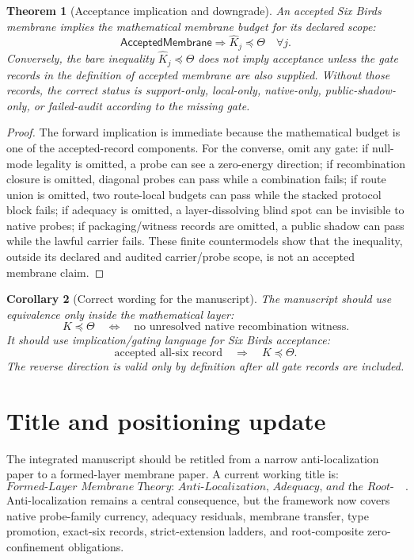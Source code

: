 \documentclass[11pt]{article}
\newtheorem{theorem}{Theorem}[section]
\newtheorem{corollary}[theorem]{Corollary}
\begin{document}
\begin{theorem}[Acceptance implication and downgrade]
An accepted Six Birds membrane implies the mathematical membrane budget for its declared scope:
\[
  \mathsf{AcceptedMembrane}\Longrightarrow \widehat K_j\preceq\Theta\quad\forall j.
\]
Conversely, the bare inequality \(\widehat K_j\preceq\Theta\) does not imply acceptance unless the gate records in the definition of accepted membrane are also supplied.  Without those records, the correct status is support-only, local-only, native-only, public-shadow-only, or failed-audit according to the missing gate.
\end{theorem}

\begin{proof}
The forward implication is immediate because the mathematical budget is one of the accepted-record components.  For the converse, omit any gate: if null-mode legality is omitted, a probe can see a zero-energy direction; if recombination closure is omitted, diagonal probes can pass while a combination fails; if route union is omitted, two route-local budgets can pass while the stacked protocol block fails; if adequacy is omitted, a layer-dissolving blind spot can be invisible to native probes; if packaging/witness records are omitted, a public shadow can pass while the lawful carrier fails.  These finite countermodels show that the inequality, outside its declared and audited carrier/probe scope, is not an accepted membrane claim.
\end{proof}

\begin{corollary}[Correct wording for the manuscript]
The manuscript should use equivalence only inside the mathematical layer:
\[
  K\preceq\Theta
  \quad\Longleftrightarrow\quad
  \text{no unresolved native recombination witness}.
\]
It should use implication/gating language for Six Birds acceptance:
\[
  \text{accepted all-six record}
  \quad\Longrightarrow\quad
  K\preceq\Theta.
\]
The reverse direction is valid only by definition after all gate records are included.
\end{corollary}

\section{Title and positioning update}

The integrated manuscript should be retitled from a narrow anti-localization paper to a formed-layer membrane paper.  A current working title is:
\[
\boxed{\textit{Formed-Layer Membrane Theory: Anti-Localization, Adequacy, and the Root-Composite Obligation}.}
\]
Anti-localization remains a central consequence, but the framework now covers native probe-family currency, adequacy residuals, membrane transfer, type promotion, exact-six records, strict-extension ladders, and root-composite zero-confinement obligations.
\end{document}
